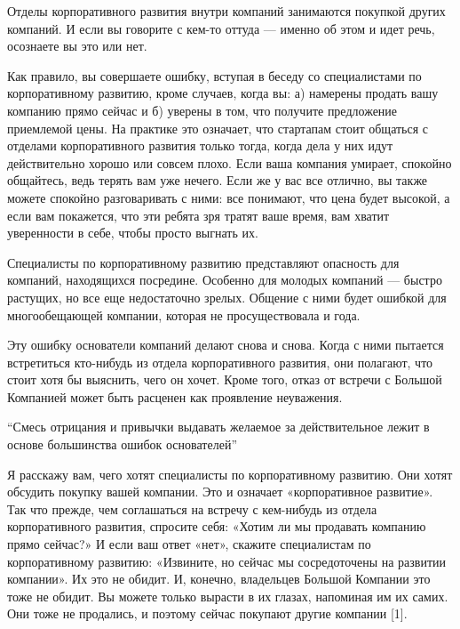 \documentclass[ebook,12pt,oneside,openany]{memoir}
\begin{document}
\maketitle

Отделы корпоративного развития внутри компаний занимаются покупкой
других компаний. И если вы говорите с кем-то оттуда — именно об этом и
идет речь, осознаете вы это или нет.

Как правило, вы совершаете ошибку, вступая в беседу со специалистами
по корпоративному развитию, кроме случаев, когда вы: а) намерены
продать вашу компанию прямо сейчас и б) уверены в том, что получите
предложение приемлемой цены. На практике это означает, что стартапам
стоит общаться с отделами корпоративного развития только тогда, когда
дела у них идут действительно хорошо или совсем плохо. Если ваша
компания умирает, спокойно общайтесь, ведь терять вам уже нечего. Если
же у вас все отлично, вы также можете спокойно разговаривать с ними:
все понимают, что цена будет высокой, а если вам покажется, что эти
ребята зря тратят ваше время, вам хватит уверенности в себе, чтобы
просто выгнать их.

Специалисты по корпоративному развитию представляют опасность для
компаний, находящихся посредине. Особенно для молодых компаний —
быстро растущих, но все еще недостаточно зрелых. Общение с ними будет
ошибкой для многообещающей компании, которая не просуществовала и
года.


Эту ошибку основатели компаний делают снова и снова. Когда с ними
пытается встретиться кто-нибудь из отдела корпоративного развития, они
полагают, что стоит хотя бы выяснить, чего он хочет. Кроме того, отказ
от встречи с Большой Компанией может быть расценен как проявление
неуважения.

“Смесь отрицания и привычки выдавать желаемое за действительное лежит
в основе большинства ошибок основателей”

Я расскажу вам, чего хотят специалисты по корпоративному развитию. Они
хотят обсудить покупку вашей компании. Это и означает «корпоративное
развитие». Так что прежде, чем соглашаться на встречу с кем-нибудь из
отдела корпоративного развития, спросите себя: «Хотим ли мы продавать
компанию прямо сейчас?» И если ваш ответ «нет», скажите специалистам
по корпоративному развитию: «Извините, но сейчас мы сосредоточены на
развитии компании». Их это не обидит. И, конечно, владельцев Большой
Компании это тоже не обидит. Вы можете только вырасти в их глазах,
напоминая им их самих. Они тоже не продались, и поэтому сейчас
покупают другие компании [1].
\end{document}
